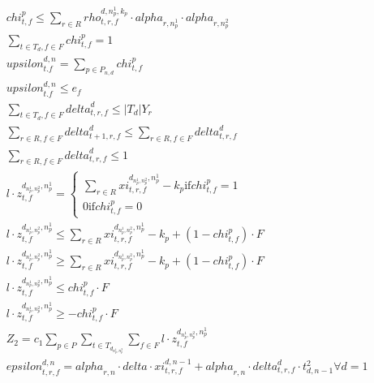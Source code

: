 \begin{align}
  & \mathit{chi}_{t , f}^{p} \leq \sum_{r \in R} \mathit{rho}_{t , r , f}^{d , n_{p}^{1} , k_{p}} \cdot \mathit{alpha}_{r , n_{p}^{1}} \cdot \mathit{alpha}_{r , n_{p}^{2}} \tag{eq\_0017} \\
  & \sum_{t \in T_{d}, f \in F} \mathit{chi}_{t , f}^{p} = 1 \tag{eq\_0018} \\
  & \mathit{upsilon}_{t . f}^{d , n} = \sum_{p \in P_{n , d}} \mathit{chi}_{t , f}^{p} \tag{eq\_0019} \\
  & \mathit{upsilon}_{t . f}^{d , n} \leq e_{f} \tag{eq\_0020} \\
  & \sum_{t \in T_{d}, f \in F} \mathit{delta}_{t , r , f}^{d} \leq \left|T_{d}\right| Y_{r} \tag{eq\_0021} \\
  & \sum_{r \in R, f \in F} \mathit{delta}_{t + 1 , r , f}^{d} \leq \sum_{r \in R, f \in F} \mathit{delta}_{t , r , f}^{d} \tag{eq\_0022} \\
  & \sum_{r \in R, f \in F} \mathit{delta}_{t , r , f}^{d} \leq 1 \tag{eq\_0023} \\
  & l \cdot z_{t , f}^{d_{n_{p}^{1} , n_{p}^{2}} , n_{p}^{1}} = \begin{cases} \sum_{r \in R} \mathit{xi}_{t , r , f}^{d_{n_{p}^{1} , n_{p}^{2}} , n_{p}^{1}} - k_{p} \text{if} \mathit{chi}_{t , f}^{p} = 1 \\ 0 \text{if} \mathit{chi}_{t , f}^{p} = 0 \end{cases} \tag{eq\_0025} \\
  & l \cdot z_{t , f}^{d_{n_{p}^{1} , n_{p}^{2}} , n_{p}^{1}} \leq \sum_{r \in R} \mathit{xi}_{t , r , f}^{d_{n_{p}^{1} , n_{p}^{2}} , n_{p}^{1}} - k_{p} + \left(1 - \mathit{chi}_{t , f}^{p}\right) \cdot F \tag{eq\_0026} \\
  & l \cdot z_{t , f}^{d_{n_{p}^{1} , n_{p}^{2}} , n_{p}^{1}} \geq \sum_{r \in R} \mathit{xi}_{t , r , f}^{d_{n_{p}^{1} , n_{p}^{2}} , n_{p}^{1}} - k_{p} + \left(1 - \mathit{chi}_{t , f}^{p}\right) \cdot F \tag{eq\_0027} \\
  & l \cdot z_{t , f}^{d_{n_{p}^{1} , n_{p}^{2}} , n_{p}^{1}} \leq \mathit{chi}_{t , f}^{p} \cdot F \tag{eq\_0028} \\
  & l \cdot z_{t , f}^{d_{n_{p}^{1} , n_{p}^{2}} , n_{p}^{1}} \geq - \mathit{chi}_{t , f}^{p} \cdot F \tag{eq\_0029} \\
  & Z_{2} = c_{1} \sum_{p \in P} \underset{t \in T_{d_{n_{p}^{1} , n_{p}^{2}}}}{\sum} \sum_{f \in F} l \cdot z_{t , f}^{d_{n_{p}^{1} , n_{p}^{2}} , n_{p}^{1}} \tag{eq\_0030} \\
  & \mathit{epsilon}_{t , r , f}^{d , n} = \mathit{alpha}_{r , n} \cdot \mathit{delta} \cdot \mathit{xi}_{t , r , f}^{d , n - 1} + \mathit{alpha}_{r , n} \cdot \mathit{delta}_{t , r , f}^{d} \cdot t_{d , n - 1}^{2} \forall d = 1 \tag{eq\_0031} \\

\end{align}
